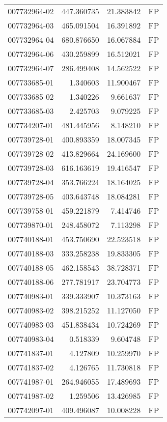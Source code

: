 \begin{tabular}{lrrl}
007732964-02 &  447.360735 &    21.383842 &   FP \\
007732964-03 &  465.091504 &    16.391892 &   FP \\
007732964-04 &  680.876650 &    16.067884 &   FP \\
007732964-06 &  430.259899 &    16.512021 &   FP \\
007732964-07 &  286.499408 &    14.562522 &   FP \\
007733685-01 &    1.340603 &    11.900467 &   FP \\
007733685-02 &    1.340226 &     9.661637 &   FP \\
007733685-03 &    2.425703 &     9.079225 &   FP \\
007734207-01 &  481.445956 &     8.148210 &   FP \\
007739728-01 &  400.893359 &    18.007345 &   FP \\
007739728-02 &  413.829664 &    24.169600 &   FP \\
007739728-03 &  616.163619 &    19.416547 &   FP \\
007739728-04 &  353.766224 &    18.164025 &   FP \\
007739728-05 &  403.643748 &    18.084281 &   FP \\
007739758-01 &  459.221879 &     7.414746 &   FP \\
007739870-01 &  248.458072 &     7.113298 &   FP \\
007740188-01 &  453.750690 &    22.523518 &   FP \\
007740188-03 &  333.258238 &    19.833305 &   FP \\
007740188-05 &  462.158543 &    38.728371 &   FP \\
007740188-06 &  277.781917 &    23.704773 &   FP \\
007740983-01 &  339.333907 &    10.373163 &   FP \\
007740983-02 &  398.215252 &    11.127050 &   FP \\
007740983-03 &  451.838434 &    10.724269 &   FP \\
007740983-04 &    0.518339 &     9.604748 &   FP \\
007741837-01 &    4.127809 &    10.259970 &   FP \\
007741837-02 &    4.126765 &    11.730818 &   FP \\
007741987-01 &  264.946055 &    17.489693 &   FP \\
007741987-02 &    1.259506 &    13.426985 &   FP \\
007742097-01 &  409.496087 &    10.008228 &   FP \\

\end{tabular}
